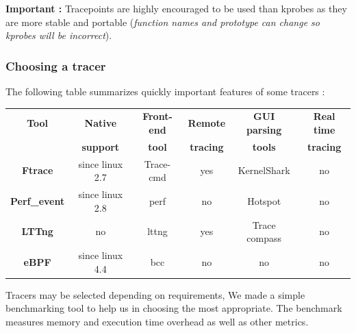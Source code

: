 \textbf{\color{orange}Important : } Tracepoints are highly encouraged to be used than kprobes as they are more stable and portable (\textit{function names and prototype can change so kprobes will be incorrect}).
\subsubsection{Choosing a tracer}
The following table summarizes quickly important features of some tracers :
\begin{center}
	\begin{tabular}{|c|c|c|c|c|c|}
		\hline
			\rowcolor{LightCyan}
			\textbf{Tool} & \textbf{Native} & \textbf{Front-end} & \textbf{Remote} & \textbf{GUI parsing} & \textbf{Real time} \\	
						\rowcolor{LightCyan}   
			 & \textbf{support} & \textbf{tool} & \textbf{tracing} & \textbf{tools} & \textbf{tracing} \\	 		
   		\hline
	    	\textbf{Ftrace} & since linux 2.7 & Trace-cmd & yes & KernelShark & no \\
	    \hline
	    	\textbf{Perf\_event} & since linux 2.8 & perf & no & Hotspot & no \\
		\hline     
        	\textbf{LTTng} & no & lttng & yes & Trace compass & no \\
		\hline     
        	\textbf{eBPF} & since linux 4.4 & bcc & no & no & no \\
   		\hline
	\end{tabular}
\end{center}

Tracers may be selected depending on requirements, We made a simple benchmarking tool to help us in choosing the most appropriate. The benchmark measures memory and execution time overhead as well as other metrics.

\begin{center}
\end{center}


